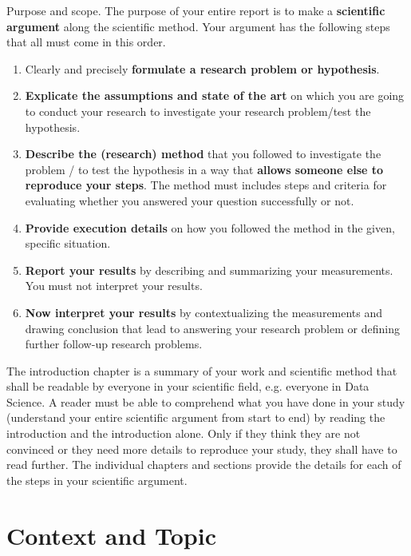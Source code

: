 \documentclass[12pt,a4paper,footinclude=true,twoside,headinclude=true]{report}
\begin{document}
\textsf{Purpose and scope}. The purpose of your entire report is to make a \textbf{scientific argument} along the scientific method. Your argument has the following steps that all must come in this order.
\begin{enumerate}
    \item Clearly and precisely  \textbf{formulate a research problem or hypothesis}.
    \item \textbf{Explicate the assumptions and state of the art} on which you are going to conduct your research to investigate your research problem/test the hypothesis. 
    \item \textbf{Describe the (research) method} that you followed to investigate the problem / to test the hypothesis in a way that \textbf{allows someone else to reproduce your steps}. The method must includes steps and criteria for evaluating whether you answered your question successfully or not.
    \item \textbf{Provide execution details} on how you followed the method in the given, specific situation.
    \item \textbf{Report your results} by describing and summarizing your measurements. You must not interpret your results.
    \item \textbf{Now interpret your results} by contextualizing the measurements and drawing conclusion that lead to answering your research problem or defining further follow-up research problems.
\end{enumerate}

The introduction chapter is a summary of your work and scientific method that shall be readable by everyone in your scientific field, e.g. everyone in Data Science. A reader must be able to comprehend what you have done in your study (understand your entire scientific argument from start to end) by reading the introduction and the introduction alone. Only if they think they are not convinced or they need more details to reproduce your study, they shall have to read further. The individual chapters and sections provide the details for each of the steps in your scientific argument.

\section{Context and Topic}\label{sec:introduction:topic}
\end{document}
